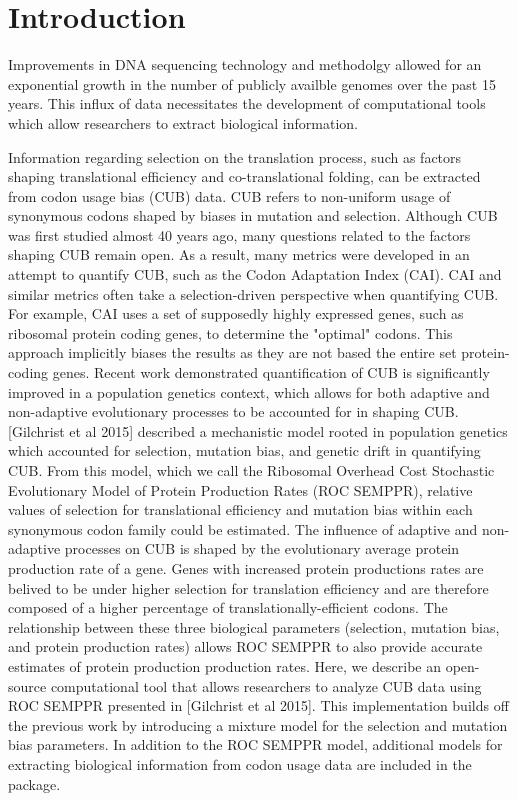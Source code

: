 \documentclass{bioinfo}
\begin{document}
\section*{Introduction}
Improvements in DNA sequencing technology and methodolgy allowed for an exponential growth in the number of publicly availble genomes over the past 15 years.
This influx of data necessitates the development of computational tools which allow researchers to extract biological information.

Information regarding selection on the translation process, such as factors shaping translational efficiency and co-translational folding, can be extracted from codon usage bias (CUB) data.
CUB refers to non-uniform usage of synonymous codons shaped by biases in mutation and selection.
Although CUB was first studied almost 40 years ago, many questions related to the factors shaping CUB remain open.
As a result, many metrics were developed in an attempt to quantify CUB, such as the Codon Adaptation Index (CAI).
CAI and similar metrics often take a selection-driven perspective when quantifying CUB. For example, CAI uses a set of supposedly highly expressed genes, such as ribosomal protein coding genes, to determine the "optimal" codons. This approach implicitly biases the results as they are not based the entire set protein-coding genes. 
Recent work demonstrated quantification of CUB is significantly improved in a population genetics context, which allows for both adaptive and non-adaptive evolutionary processes to be accounted for in shaping CUB.
[Gilchrist et al 2015] described a mechanistic model rooted in population genetics which accounted for selection, mutation bias, and genetic drift in quantifying CUB. From this model, which we call the Ribosomal Overhead Cost Stochastic Evolutionary Model of Protein Production Rates (ROC SEMPPR), relative values of selection for translational efficiency and mutation bias within each synonymous codon family could be estimated. The influence of adaptive and non-adaptive processes on CUB is shaped by the evolutionary average protein production rate of a gene. Genes with increased protein productions rates are belived to be under higher selection for translation efficiency and are therefore composed of a higher percentage of translationally-efficient codons. The relationship between these three biological parameters (selection, mutation bias, and protein production rates) allows ROC SEMPPR to also provide accurate estimates of protein production production rates. 
Here, we describe an open-source computational tool that allows researchers to analyze CUB data using ROC SEMPPR presented in [Gilchrist et al 2015]. This implementation builds off the previous work by introducing a mixture model for the selection and mutation bias parameters. In addition to the ROC SEMPPR model, additional models for extracting biological information from codon usage data are included in the package.
\end{document}
